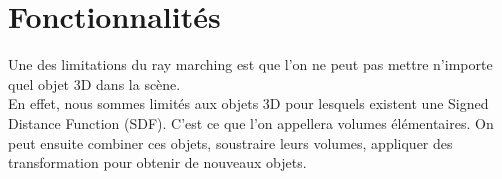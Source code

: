 \section{Fonctionnalités}
Une des limitations du ray marching est que l'on ne peut pas mettre n'importe quel objet 3D dans la scène.\\
En effet, nous sommes limités aux objets 3D pour lesquels existent une Signed Distance Function (SDF). C'est ce que l'on appellera volumes élémentaires. On peut ensuite combiner ces objets, soustraire leurs volumes, appliquer des transformation pour obtenir de nouveaux objets.



